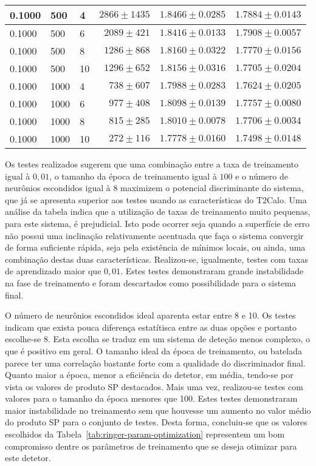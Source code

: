 \begin{table}
\begin{center}
{\begin{tabular}{|l|l|l|r|r|r|}
0.1000 & 500 & 4 & $2866\pm1435$ & $1.8466\pm0.0285$ & $1.7884\pm0.0143$ \\ \hline
0.1000 & 500 & 6 & $2089\pm421$ & $1.8416\pm0.0133$ & $1.7908\pm0.0057$ \\ \hline
0.1000 & 500 & 8 & $1286\pm868$ & $1.8160\pm0.0322$ & $1.7770\pm0.0156$ \\ \hline
0.1000 & 500 & 10 & $1296\pm652$ & $1.8156\pm0.0316$ & $1.7705\pm0.0204$ \\ \hline
0.1000 & 1000 & 4 & $738\pm607$ & $1.7988\pm0.0283$ & $1.7624\pm0.0205$ \\ \hline
0.1000 & 1000 & 6 & $977\pm408$ & $1.8098\pm0.0139$ & $1.7757\pm0.0080$ \\ \hline
0.1000 & 1000 & 8 & $815\pm285$ & $1.8010\pm0.0078$ & $1.7706\pm0.0034$ \\ \hline
0.1000 & 1000 & 10 & $272\pm116$ & $1.7778\pm0.0160$ & $1.7498\pm0.0148$ \\ \hline

\end{tabular}}
\renewcommand{\baselinestretch}{1.0}
\end{center}
\end{table}

Os testes realizados sugerem que uma combinação entre a taxa de treinamento
igual à $0,01$, o tamanho da época de treinamento igual à $100$ e o número de
neurônios escondidos igual à $8$ maximizem o potencial discriminante do
sistema, que já se apresenta superior aos testes usando as características do
T2Calo. Uma análise da tabela indica que a utilização de taxas de treinamento
muito pequenas, para este sistema, é prejudicial. Isto pode ocorrer seja
quando a superfície de erro não possui uma inclinação relativamente acentuada
que faça o sistema convergir de forma suficiente rápida, seja pela existência
de mínimos locais, ou ainda, uma combinação destas duas
características. Realizou-se, igualmente, testes com taxas de aprendizado
maior que $0,01$. Estes testes demonstraram grande instabilidade na fase de
treinamento e foram descartados como possibilidade para o sistema final.

O número de neurônios escondidos ideal aparenta estar entre 8 e 10. Os testes
indicam que exista pouca diferença estatítisca entre as duas opções e portanto
escolhe-se 8. Esta escolha se traduz em um sistema de deteção menos complexo,
o que é positivo em geral. O tamanho ideal da época de treinamento, ou
batelada parece ter uma correlação bastante forte com a qualidade do
discriminador final. Quanto maior a época, menor a eficiência do detetor, em
média, tendo-se por vista os valores de produto SP destacados. Mais uma vez,
realizou-se testes com valores para o tamanho da época menores que 100. Estes
testes demonstraram maior instabilidade no treinamento sem que houvesse um
aumento no valor médio do produto SP para o conjunto de testes. Desta forma,
concluiu-se que os valores escolhidos da
Tabela~\ref{tab:ringer-param-optimization} representem um bom compromisso 
dentre os parâmetros de treinamento que se deseja otimizar para este detetor.

